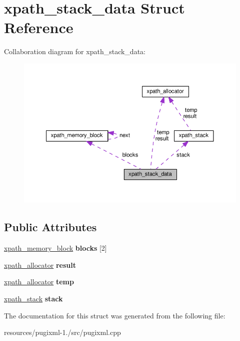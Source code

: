 \hypertarget{structxpath__stack__data}{\section{xpath\+\_\+stack\+\_\+data Struct Reference}
\label{structxpath__stack__data}
}


Collaboration diagram for xpath\+\_\+stack\+\_\+data\+:
\nopagebreak
\begin{figure}[H]
\begin{center}
\leavevmode
\includegraphics[width=350pt]{structxpath__stack__data__coll__graph}
\end{center}
\end{figure}
\subsection*{Public Attributes}
\begin{DoxyCompactItemize}
\item 
\hypertarget{structxpath__stack__data_a6821cc444dd65d997467fd3f757f4aff}{\hyperlink{structxpath__memory__block}{xpath\+\_\+memory\+\_\+block} {\bfseries blocks} \mbox{[}2\mbox{]}}\label{structxpath__stack__data_a6821cc444dd65d997467fd3f757f4aff}

\item 
\hypertarget{structxpath__stack__data_ab073a685c66383ded44076993afe62d6}{\hyperlink{classxpath__allocator}{xpath\+\_\+allocator} {\bfseries result}}\label{structxpath__stack__data_ab073a685c66383ded44076993afe62d6}

\item 
\hypertarget{structxpath__stack__data_a56e6bb486d52f4c5c2d02370e1b41058}{\hyperlink{classxpath__allocator}{xpath\+\_\+allocator} {\bfseries temp}}\label{structxpath__stack__data_a56e6bb486d52f4c5c2d02370e1b41058}

\item 
\hypertarget{structxpath__stack__data_ad26a92328f9aaf83fa62cb6695dbee90}{\hyperlink{structxpath__stack}{xpath\+\_\+stack} {\bfseries stack}}\label{structxpath__stack__data_ad26a92328f9aaf83fa62cb6695dbee90}

\end{DoxyCompactItemize}


The documentation for this struct was generated from the following file\+:\begin{DoxyCompactItemize}
\item 
resources/pugixml-\/1./src/pugixml.\+cpp\end{DoxyCompactItemize}

